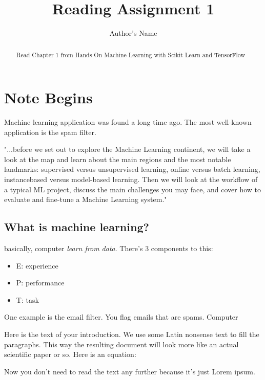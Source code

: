 \documentclass{article}
\begin{document}
\title{Reading Assignment 1}
\author{Author's Name}

\maketitle

\begin{abstract}
Read Chapter 1 from Hands On Machine Learning with Scikit Learn and TensorFlow
\end{abstract}


\section{Note Begins}

Machine learning application was found a long time ago. The most well-known 
application is the spam filter.

"...before we set out to explore the Machine Learning continent, we will take a
look at the map and learn about the main regions and the most notable landmarks:
supervised versus unsupervised learning, online versus batch learning, instancebased
versus model-based learning. Then we will look at the workflow of a typical ML
project, discuss the main challenges you may face, and cover how to evaluate and
fine-tune a Machine Learning system."

\subsection{What is machine learning?}

basically, computer \textit{learn from data}. There's 3 components to this: 
\begin{itemize}
    \item E: experience
    \item P: performance
    \item T: task
\end{itemize}

One example is the email filter. You flag emails that are spams. Computer 

Here is the text of your introduction. We use some Latin nonsense text to fill
the paragraphs. This way the resulting document will look more like an actual
scientific paper or so. Here is an equation:

Now you don't need to read the text any further because it's just Lorem ipsum.
\end{document}
